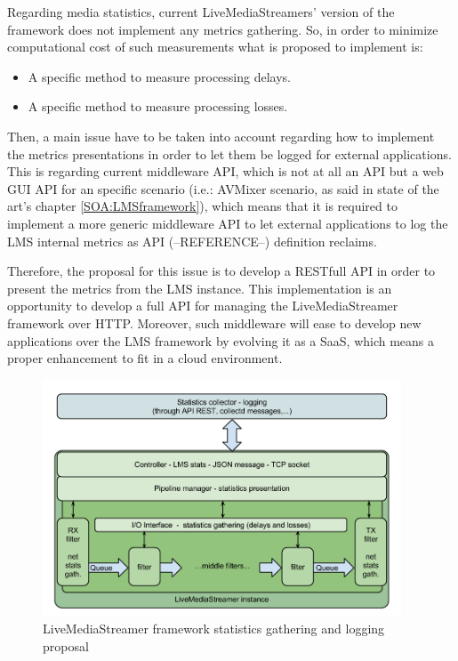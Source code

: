 Regarding media statistics, current LiveMediaStreamers' version of the framework does not implement any metrics gathering. So, in order to minimize computational cost of such measurements what is proposed to implement is:

\begin{itemize}
\item A specific method to measure processing delays.
\item A specific method to measure processing losses.
\end{itemize}

Then, a main issue have to be taken into account regarding how to implement the metrics presentations in order to let them be logged for external applications. This is regarding current middleware API, which is not at all an API but a web GUI API for an specific scenario (i.e.: AVMixer scenario, as said in state of the art's chapter \ref{SOA:LMSframework}), which means that it is required to implement a more generic middleware API to let external applications to log the LMS internal metrics as API (--REFERENCE--) definition reclaims. 

Therefore, the proposal for this issue is to develop a RESTfull API in order to present the metrics from the LMS instance. This implementation is an opportunity to develop a full API for managing the LiveMediaStreamer framework over HTTP.  Moreover, such middleware will ease to develop new applications over the LMS framework by evolving it as a SaaS, which means a proper enhancement to fit in a cloud environment. 

\begin{figure}[htb]
\begin{center}
\includegraphics[width=0.95\textwidth]{./images/appArch.png}
\caption{LiveMediaStreamer framework statistics gathering and logging proposal}
\label{F:appArch}
\end{center}
\end{figure}

